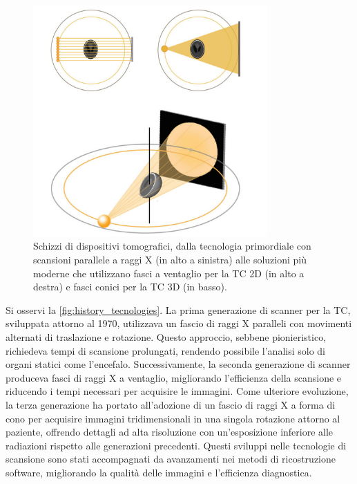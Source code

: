 \documentclass[12pt,a4paper]{report}
\begin{document}
\begin{figure}[H]
  \centering
  \includegraphics[width=0.8\textwidth]{tecniche-di-scansione}
  \caption{\label{fig:history_tecnologies} Schizzi di dispositivi tomografici, dalla tecnologia primordiale
           con scansioni parallele a raggi X (in alto a sinistra) alle soluzioni più moderne che utilizzano fasci a ventaglio per
           la TC 2D (in alto a destra) e fasci conici per la TC 3D (in basso). \cite{MoroLoli2021}}
\end{figure}

Si osservi la \autoref{fig:history_tecnologies}.
La prima generazione di scanner per la TC, sviluppata attorno al 1970, utilizzava un fascio di raggi X paralleli con movimenti
alternati di traslazione e rotazione.
Questo approccio, sebbene pionieristico, richiedeva tempi di scansione prolungati, rendendo possibile l'analisi solo di organi
statici come l'encefalo.
Successivamente, la seconda generazione di scanner produceva fasci di raggi X a ventaglio, migliorando l'efficienza della
scansione e riducendo i tempi necessari per acquisire le immagini.
Come ulteriore evoluzione, la terza generazione ha portato all'adozione di un fascio di raggi X a forma di cono per acquisire
immagini tridimensionali in una singola rotazione attorno al paziente, offrendo dettagli ad alta risoluzione con un'esposizione
inferiore alle radiazioni rispetto alle generazioni precedenti.
Questi sviluppi nelle tecnologie di scansione sono stati accompagnati da avanzamenti nei metodi di ricostruzione software,
migliorando la qualità delle immagini e l'efficienza diagnostica.
\end{document}
